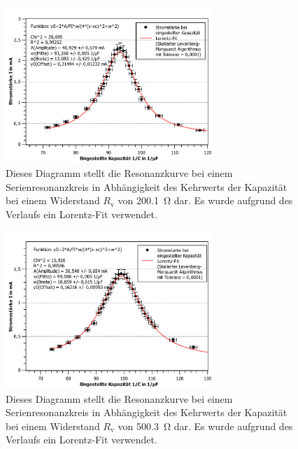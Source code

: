 	\begin{figure}[ht]
		\centering
		\includegraphics[width=0.7\textwidth]{auswertung/Reihe-200ohm(algo).pdf}
		\caption{Dieses Diagramm stellt die Resonanzkurve bei einem Serienresonanzkreis in Abhängigkeit des Kehrwerts der Kapazität bei einem Widerstand $R_\text{v}$ von \SI{200,1}{\ohm} dar. Es wurde aufgrund des Verlaufs ein Lorentz-Fit verwendet.}
		\label{fig:reihe200}	
	\end{figure}
	\begin{figure}[ht]
		\centering
		\includegraphics[width=0.7\textwidth]{auswertung/Reihe-500ohm(algo).pdf}
		\caption{Dieses Diagramm stellt die Resonanzkurve bei einem Serienresonanzkreis in Abhängigkeit des Kehrwerts der Kapazität bei einem Widerstand $R_\text{v}$ von \SI{500,3}{\ohm} dar. Es wurde  aufgrund des Verlaufs ein Lorentz-Fit verwendet.}
		\label{fig:reihe500}	
	\end{figure}
